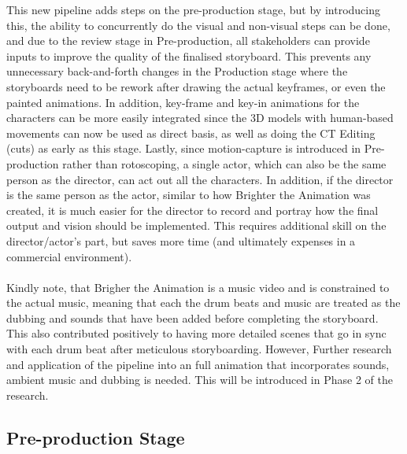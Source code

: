 This new pipeline adds steps on the pre-production stage, but by introducing this, the ability to concurrently do the visual and non-visual steps can be done, and due to the review stage in Pre-production, all stakeholders can provide inputs to improve the quality of the finalised storyboard. This prevents any unnecessary back-and-forth changes in the Production stage where the storyboards need to be rework after drawing the actual keyframes, or even the painted animations. In addition, key-frame and key-in animations for the characters can be more easily integrated since the 3D models with human-based movements can now be used as direct basis, as well as doing the CT Editing (cuts) as early as this stage. Lastly, since motion-capture is introduced in Pre-production rather than rotoscoping, a single actor, which can also be the same person as the director, can act out all the characters. In addition, if the director is the same person as the actor, similar to how Brighter the Animation was created, it is much easier for the director to record and portray how the final output and vision should be implemented. This requires additional skill on the director/actor's part, but saves more time (and ultimately expenses in a commercial environment).\\\\
Kindly note, that Brigher the Animation is a music video and is constrained to the actual music, meaning that each the drum beats and music are treated as the dubbing and sounds that have been added before completing the storyboard. This also contributed positively to having more detailed scenes that go in sync with each drum beat after meticulous storyboarding. However, Further research and application of the pipeline into an full animation that incorporates sounds, ambient music and dubbing is needed. This will be introduced in Phase 2 of the research.

\subsection{Pre-production Stage}

